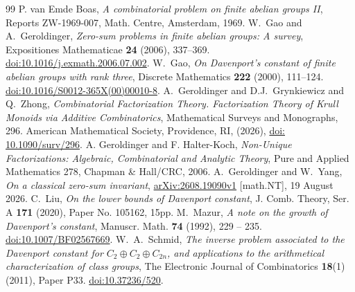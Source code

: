 \documentclass[10pt,a4paper]{amsart}
\begin{document}
\begin{thebibliography}{99}
 {P. van} {Emde Boas}, \emph{A combinatorial problem on finite abelian groups {II}}, Reports ZW-1969-007, Math. Centre, Amsterdam, 1969.
 W.~Gao and A.~Geroldinger, \emph{Zero-sum problems in finite abelian groups: A survey}, Expositiones Mathematicae \textbf{24} (2006), 337--369. \href{https://doi.org/10.1016/j.exmath.2006.07.002} {doi:10.1016/j.exmath.2006.07.002}.
 W.~Gao, \emph{On Davenport's constant of finite abelian groups with rank three}, Discrete Mathematics \textbf{222} (2000), 111--124. \href{https://doi.org/10.1016/S0012-365X(00)00010-8} {doi:10.1016/S0012-365X(00)00010-8}.
 A.~Geroldinger and D.J.~Grynkiewicz and Q.~Zhong, \emph{Combinatorial Factorization Theory. Factorization Theory of Krull Monoids via Additive Combinatorics}, Mathematical Surveys and Monographs, 296. American Mathematical Society, Providence, RI, (2026), \href{https://bookstore.ams.org/view?ProductCode=SURV/296}{doi: 10.1090/surv/296}.
 A. Geroldinger and F. Halter-Koch, \emph{Non-Unique Factorizations: Algebraic, Combinatorial and Analytic Theory}, Pure and Applied Mathematics 278, Chapman \& Hall/CRC, 2006.
 A.~Geroldinger and W.~Yang, \emph{On a classical zero-sum invariant}, \href{https://arxiv.org/abs/2608.19090v1}{arXiv:2608.19090v1} [math.NT], 19 August 2026.
 C.~Liu, \emph{On the lower bounds of {D}avenport constant}, J. Comb. Theory, Ser. A {\bf 171} (2020), {Paper No. 105162, 15pp}.
 M.~Mazur, \emph{A note on the growth of {D}avenport's constant}, Manuscr. Math. {\bf 74} (1992), 229 -- 235. \href{https://doi.org/10.1007/BF02567669}{doi:10.1007/BF02567669}.
 W.~A.~Schmid, \emph{The inverse problem associated to the Davenport constant for $C_2\oplus C_2\oplus C_{2n}$, and applications to the arithmetical characterization of class groups}, The Electronic Journal of Combinatorics \textbf{18}(1) (2011), Paper P33. \href{https://doi.org/10.37236/520}{doi:10.37236/520}.
\end{thebibliography}
\end{document}

